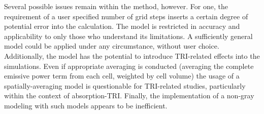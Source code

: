 Several possible issues remain within the method, however. For one, the requirement of a user specified number of grid steps inserts a certain degree of potential error into the calculation. 
The model is restricted in accuracy and applicability to only those who understand its limitations. A sufficiently general model could be applied under any circumstance, without user choice.
Additionally, the model has the potential to introduce TRI-related effects into the simulations. 
Even if appropriate averaging is conducted (averaging the complete emissive power term from each cell, weighted by cell volume) the usage of a spatially-averaging model is questionable for TRI-related studies, particularly within the context of absorption-TRI.
Finally, the implementation of a non-gray modeling with such models appears to be inefficient.

